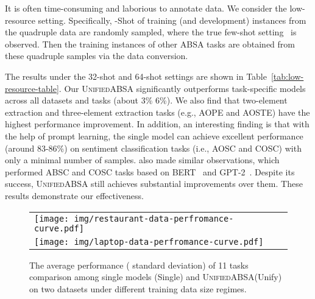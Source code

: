 \documentclass[11pt]{article}
\newcommand{\UnifiedABSA}{\textsc{UnifiedABSA}\xspace}
\begin{document}
It is often time-consuming and laborious to annotate data. We consider the low-resource setting. Specifically, -Shot of training (and development) instances from the quadruple data are randomly sampled, where the true few-shot setting~\citep{DBLP:conf/nips/PerezKC21} is observed. Then the training instances of other ABSA tasks are obtained from these quadruple samples via the data conversion.


The results under the 32-shot and 64-shot settings are shown in Table~\ref{tab:low-resource-table}. Our \UnifiedABSA significantly outperforms task-specific models across all datasets and tasks (about 3\%  6\%). We also find that two-element extraction and three-element extraction tasks (e.g., AOPE and AOSTE) have the highest performance improvement. In addition, an interesting finding is that with the help of prompt learning, the single model can achieve excellent performance (around 83-86\%) on sentiment classification tasks (i.e., AOSC and COSC) with only a minimal number of samples. \citet{seoh-etal-2021-open} also made similar observations, which performed ABSC and COSC tasks based on BERT~\citep{devlin-etal-2019-bert} and GPT-2~\citep{radford2019gpt2}. Despite its success, \UnifiedABSA still achieves substantial improvements over them. These results demonstrate our effectiveness. 


\begin{figure}[t]
\centering
  \setlength{\belowcaptionskip}{-0.5cm}
  \setlength{\abovecaptionskip}{-0.3cm}
\begin{tabular}{p{7cm}p{7cm}}
\centering
\begin{minipage}{0.5\textwidth}

    \hbox{\hspace{0.05em}\texttt{[image: img/restaurant-data-perfromance-curve.pdf]}}
  \end{minipage}\vspace{0.3em}
\\
\begin{minipage}{0.5\textwidth}

    \hbox{\hspace{0.05em}\texttt{[image: img/laptop-data-perfromance-curve.pdf]}}
  \end{minipage}\vspace{0.3em}\\
\end{tabular}
\caption{The average performance ( standard deviation) of 11 tasks comparison among single models (Single) and \UnifiedABSA (Unify) on two datasets under different training data size regimes.}
\label{fig:two-data-performance-curve}
\end{figure}
\end{document}
